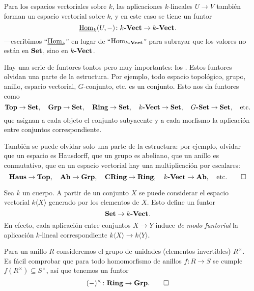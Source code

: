 \documentclass{article}
\numberwithin{equation}{section}
\theoremstyle{definition}
\begin{document}
\begin{ejemplo}
  Para los espacios vectoriales sobre $k$, las aplicaciones $k$-lineales
  $U\to V$ también forman un espacio vectorial sobre $k$, y en este caso se
  tiene un funtor
  $$\underline{\operatorname{Hom}}_k (U, -)\colon k\text{\bf -Vect} \to k\text{\bf -Vect}.$$
  ---escribimos ``$\underline{\operatorname{Hom}}_k$'' en lugar de ``$\operatorname{Hom}_{k\text{\bf -Vect}}$'' para
  subrayar que los valores no están en $\text{\bf Set}$, sino en $k\text{\bf -Vect}$.
\end{ejemplo}

\begin{ejemplo}
  Hay una serie de funtores tontos pero muy importantes: los
  . Estos funtores olvidan una parte de la
  estructura. Por ejemplo, todo espacio topológico, grupo, anillo, espacio
  vectorial, $G$-conjunto, etc. es un conjunto. Esto nos da funtores como
  \[ \text{\bf Top} \to \text{\bf Set}, \quad
     \text{\bf Grp} \to \text{\bf Set}, \quad
     \text{\bf Ring} \to \text{\bf Set}, \quad
     k\text{\bf -Vect} \to \text{\bf Set}, \quad
     G\text{\bf -Set}\to \text{\bf Set}, \quad
     \text{etc.} \]
  que asignan a cada objeto el conjunto subyacente y a cada morfismo la
  aplicación entre conjuntos correspondiente.

  También se puede olvidar solo una parte de la estructura: por ejemplo, olvidar
  que un espacio es Hausdorff, que un grupo es abeliano, que un anillo es
  conmutativo, que en un espacio vectorial hay una multiplicación por escalares:
  \[ \text{\bf Haus} \to \text{\bf Top}, \quad
     \text{\bf Ab} \to \text{\bf Grp}, \quad
     \text{\bf CRing} \to \text{\bf Ring}, \quad
     k\text{\bf -Vect} \to \text{\bf Ab}, \quad
     \text{etc.} \qedhere \]
\end{ejemplo}

\begin{ejemplo}
  Sea $k$ un cuerpo. A partir de un conjunto $X$ se puede considerar el espacio
  vectorial $k \langle X\rangle$ generado por los elementos de $X$. Esto define
  un funtor
  $$\text{\bf Set} \to k\text{\bf -Vect}.$$
  En efecto, cada aplicación entre conjuntos $X\to Y$ induce
  \emph{de modo funtorial} la aplicación $k$-lineal correspondiente
  $k \langle X\rangle \to k \langle Y\rangle$.
\end{ejemplo}

\begin{ejemplo}
  Para un anillo $R$ consideremos el grupo de unidades (elementos invertibles)
  $R^\times$. Es fácil comprobar que para todo homomorfismo de anillos
  $f\colon R\to S$ se cumple $f (R^\times) \subseteq S^\times$, así que tenemos
  un funtor
  \[ (-)^\times\colon \text{\bf Ring} \to \text{\bf Grp}. \qedhere \]
\end{ejemplo}
\end{document}
